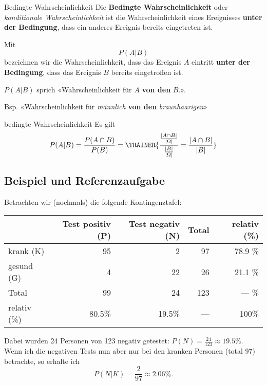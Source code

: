 \newpage


\begin{definition}{Bedingte Wahrscheinlichkeit}{}
Die \textbf{Bedingte Wahrscheinlichkeit} oder \textit{konditionale
  Wahrscheinlichkeit} ist die Wahrscheinlichkeit eines Ereignisses
\textbf{unter der Bedingung}, dass ein anderes Ereignis bereits
eingetreten ist.

  Mit
  $$P(A | B)$$
  bezeichnen wir die Wahrscheinlichkeit, dass das Ereignis $A$
  eintritt \textbf{unter der Bedingung}, dass das Ereignis $B$ bereits
  eingetroffen ist.
\end{definition}

\begin{bemerkung}{}{}
  $P(A|B)$ sprich «Wahrscheinlichkeit für $A$ \textbf{von den} $B$.».

  Bsp. «Wahrscheinlichkeit für \textit{männlich} \textbf{von den} \textit{braunhaarigen}»  
\end{bemerkung}


\begin{gesetz}{bedingte Wahrscheinlichkeit}{}
  Es gilt
  $$P(A|B) = \frac{P(A\cap B)}{P(B)} = \TRAINER{  \frac{\frac{|A\cap B|}{|\Omega|}}{\frac{|B|}{|\Omega|}}= \frac{|A\cap B|}{|B|}}$$
  
\end{gesetz}
\newpage

\subsection{Beispiel und Referenzaufgabe}
Betrachten wir (nochmals) die folgende Kontingenztafel:

  \begin{tabular}{|l|r|r|r|r|}\hline
                 & Test positiv (P) & Test negativ (N)& Total & relativ (\%) \\\hline
    krank (K)    & 95               & 2               & 97    & 78.9 \%      \\\hline    
    gesund (G)   & 4                & 22              & 26    & 21.1 \%      \\\hline
    Total        & 99               & 24              & 123   &  --- \%      \\\hline
    relativ (\%) & 80.5\%           &19.5\%           & ---   &   100\%      \\\hline
  \end{tabular}
  
Dabei wurden 24 Personen von 123 negativ getestet: $P(N) =
\frac{24}{123}\approx 19.5\%$.
Wenn ich die negativen Tests nun aber nur bei den kranken Personen
(total 97) betrachte, so erhalte ich
$$P(N|K) = \frac{2}{97} \approx 2.06\%.$$


